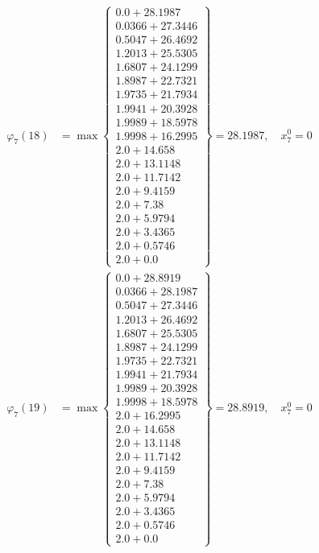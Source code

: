 \documentclass{article}
\begin{document}
\begin{align*}
\varphi_{7}(18) &= \max \left\{ \begin{array}{c}
0.0 + 28.1987 \\
 0.0366 + 27.3446 \\
 0.5047 + 26.4692 \\
 1.2013 + 25.5305 \\
 1.6807 + 24.1299 \\
 1.8987 + 22.7321 \\
 1.9735 + 21.7934 \\
 1.9941 + 20.3928 \\
 1.9989 + 18.5978 \\
 1.9998 + 16.2995 \\
 2.0 + 14.658 \\
 2.0 + 13.1148 \\
 2.0 + 11.7142 \\
 2.0 + 9.4159 \\
 2.0 + 7.38 \\
 2.0 + 5.9794 \\
 2.0 + 3.4365 \\
 2.0 + 0.5746 \\
 2.0 + 0.0
\end{array} \right\}=28.1987, \quad x_{7}^0=0\\
  
\varphi_{7}(19) &= \max \left\{ \begin{array}{c}
0.0 + 28.8919 \\
 0.0366 + 28.1987 \\
 0.5047 + 27.3446 \\
 1.2013 + 26.4692 \\
 1.6807 + 25.5305 \\
 1.8987 + 24.1299 \\
 1.9735 + 22.7321 \\
 1.9941 + 21.7934 \\
 1.9989 + 20.3928 \\
 1.9998 + 18.5978 \\
 2.0 + 16.2995 \\
 2.0 + 14.658 \\
 2.0 + 13.1148 \\
 2.0 + 11.7142 \\
 2.0 + 9.4159 \\
 2.0 + 7.38 \\
 2.0 + 5.9794 \\
 2.0 + 3.4365 \\
 2.0 + 0.5746 \\
 2.0 + 0.0
\end{array} \right\}=28.8919, \quad x_{7}^0=0\\
  

\end{align*}
\end{document}
